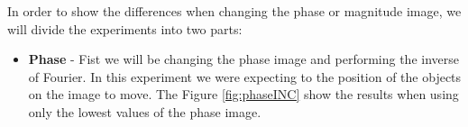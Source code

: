 \documentclass[12pt,a4paper]{article}
\begin{document}
In order to show the differences when changing the phase or magnitude image, we will divide the experiments into two parts:

\begin{itemize}
	\item \textbf{Phase} - Fist we will be changing the phase image and performing the inverse of Fourier. In this experiment we were expecting to the position of the objects on the image to move. The Figure \ref{fig:phaseINC} show the results when using only the lowest values of the phase image.

	\begin{figure}[!h]
		\centering
		\quad

\end{figure}
\end{itemize}
\end{document}

